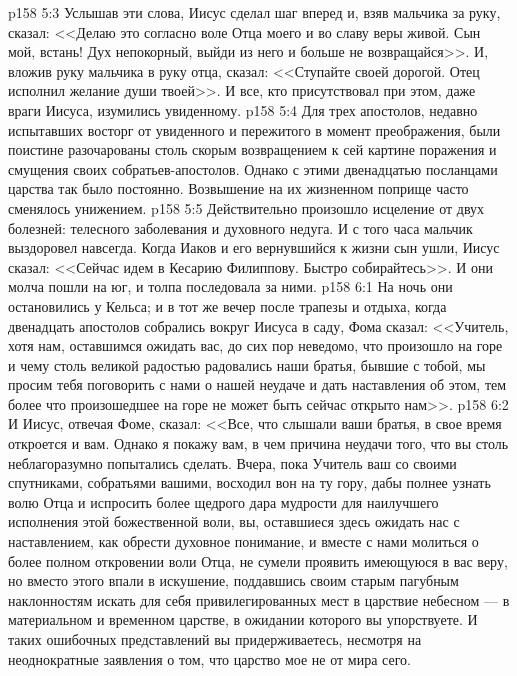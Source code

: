 \vs p158 5:3 Услышав эти слова, Иисус сделал шаг вперед и, взяв мальчика за руку, сказал: <<Делаю это согласно воле Отца моего и во славу веры живой. Сын мой, встань! Дух непокорный, выйди из него и больше не возвращайся>>. И, вложив руку мальчика в руку отца, сказал: <<Ступайте своей дорогой. Отец исполнил желание души твоей>>. И все, кто присутствовал при этом, даже враги Иисуса, изумились увиденному.
\vs p158 5:4 Для трех апостолов, недавно испытавших восторг от увиденного и пережитого в момент преображения, были поистине разочарованы столь скорым возвращением к сей картине поражения и смущения своих собратьев\hyp{}апостолов. Однако с этими двенадцатью посланцами царства так было постоянно. Возвышение на их жизненном поприще часто сменялось унижением.
\vs p158 5:5 Действительно произошло исцеление от двух болезней: телесного заболевания и духовного недуга. И с того часа мальчик выздоровел навсегда. Когда Иаков и его вернувшийся к жизни сын ушли, Иисус сказал: <<Сейчас идем в Кесарию Филиппову. Быстро собирайтесь>>. И они молча пошли на юг, и толпа последовала за ними.
\vs p158 6:1 На ночь они остановились у Кельса; и в тот же вечер после трапезы и отдыха, когда двенадцать апостолов собрались вокруг Иисуса в саду, Фома сказал: <<Учитель, хотя нам, оставшимся ожидать вас, до сих пор неведомо, что произошло на горе и чему столь великой радостью радовались наши братья, бывшие с тобой, мы просим тебя поговорить с нами о нашей неудаче и дать наставления об этом, тем более что произошедшее на горе не может быть сейчас открыто нам>>.
\vs p158 6:2 И Иисус, отвечая Фоме, сказал: <<Все, что слышали ваши братья, в свое время откроется и вам. Однако я покажу вам, в чем причина неудачи того, что вы столь неблагоразумно попытались сделать. Вчера, пока Учитель ваш со своими спутниками, собратьями вашими, восходил вон на ту гору, дабы полнее узнать волю Отца и испросить более щедрого дара мудрости для наилучшего исполнения этой божественной воли, вы, оставшиеся здесь ожидать нас с наставлением, как обрести духовное понимание, и вместе с нами молиться о более полном откровении воли Отца, не сумели проявить имеющуюся в вас веру, но вместо этого впали в искушение, поддавшись своим старым пагубным наклонностям искать для себя привилегированных мест в царствие небесном --- в материальном и временном царстве, в ожидании которого вы упорствуете. И таких ошибочных представлений вы придерживаетесь, несмотря на неоднократные заявления о том, что царство мое не от мира сего.
